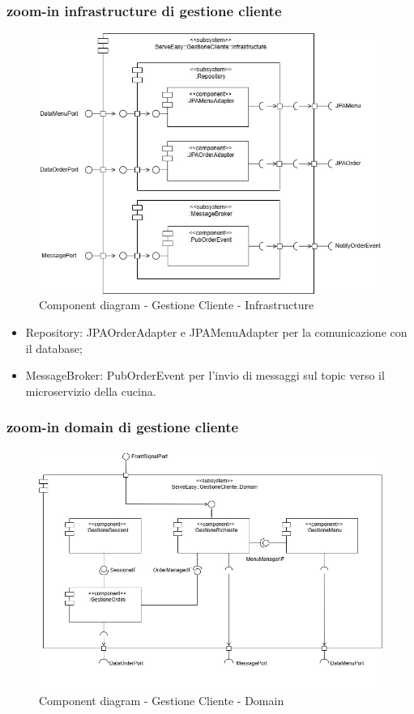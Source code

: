 \subsubsection{zoom-in infrastructure di gestione cliente}
\begin{figure}[H]
	\centering
	\includegraphics[scale=0.5]{iterazione1/images/GestioneCliente_subsystem-Infrastructure.jpg}
	\caption{Component diagram - Gestione Cliente - Infrastructure \label{fig:component_diagram_gestione_cliente_infrastructure}}
\end{figure}
\begin{itemize}
    \item Repository: JPAOrderAdapter e JPAMenuAdapter per la comunicazione con il database;
    \item MessageBroker: PubOrderEvent per l'invio di messaggi sul topic verso il microservizio della cucina.
\end{itemize}

\subsubsection{zoom-in domain di gestione cliente}
\begin{figure}[H]
	\centering
	\includegraphics[scale=0.5]{iterazione1/images/GestioneCliente_subsystem-Domain.jpg}
	\caption{Component diagram - Gestione Cliente - Domain \label{fig:component_diagram_gestione_cliente_domain}}
\end{figure}

